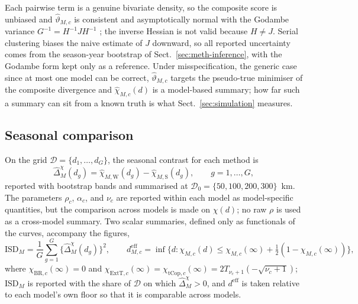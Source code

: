 Each pairwise term is a genuine bivariate density, so the composite score is unbiased and \(\widehat\vartheta_{M,c}\) is consistent and asymptotically normal with the Godambe variance \(G^{-1}=H^{-1}JH^{-1}\) \citep{varin2011,padoan2010}; the inverse Hessian is not valid because \(H\ne J\). Serial clustering biases the naive estimate of \(J\) downward, so all reported uncertainty comes from the season-year bootstrap of Sect.~\ref{sec:meth-inference}, with the Godambe form kept only as a reference. Under misspecification, the generic case since at most one model can be correct, \(\widehat\vartheta_{M,c}\) targets the pseudo-true minimiser of the composite divergence and \(\widehat\chi_{M,c}(d)\) is a model-based summary; how far such a summary can sit from a known truth is what Sect.~\ref{sec:simulation} measures.

\subsection{Seasonal comparison}\label{sec:meth-comparison}

On the grid \(\mathcal D=\{d_1,\dots,d_G\}\), the seasonal contrast for each method is
\begin{equation}
  \widehat\Delta_M^{\chi}(d_g)=\widehat\chi_{M,\mathrm W}(d_g)-\widehat\chi_{M,\mathrm S}(d_g),
  \qquad g=1,\dots,G,
\end{equation}
reported with bootstrap bands and summarised at \(\mathcal D_0=\{50,100,200,300\}\)~km. The parameters \(\rho_c\), \(\alpha_c\), and \(\nu_c\) are reported within each model as model-specific quantities, but the comparison across models is made on \(\chi(d)\); no raw \(\rho\) is used as a cross-model summary. Two scalar summaries, defined only as functionals of the curves, accompany the figures,
\begin{equation}
  \mathrm{ISD}_M=\frac1G\sum_{g=1}^G\bigl\{\widehat\Delta_M^{\chi}(d_g)\bigr\}^2,
  \qquad
  d^{\mathrm{eff}}_{M,c}=\inf\{d:\chi_{M,c}(d)\le\chi_{M,c}(\infty)+\tfrac12(1-\chi_{M,c}(\infty))\},
\end{equation}
where \(\chi_{\mathrm{BR},c}(\infty)=0\) and \(\chi_{\mathrm{ExtT},c}(\infty)=\chi_{\mathrm{tCop},c}(\infty)=2T_{\nu_c+1}(-\sqrt{\nu_c+1})\); \(\mathrm{ISD}_M\) is reported with the share of \(\mathcal D\) on which \(\widehat\Delta_M^{\chi}>0\), and \(d^{\mathrm{eff}}\) is taken relative to each model's own floor so that it is comparable across models.

